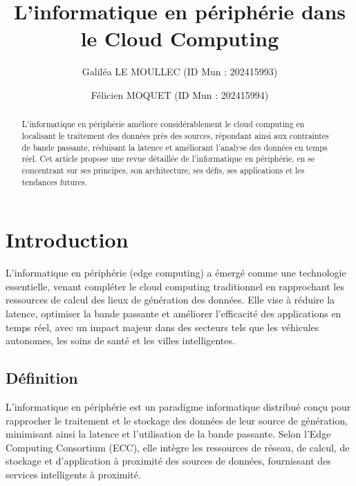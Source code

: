 \documentclass[runningheads]{llncs}
\begin{document}
\title{L'informatique en périphérie dans le Cloud Computing}

\author{Galiléa LE MOULLEC (ID Mun : 202415993) \and Félicien MOQUET (ID Mun : 202415994)}

\maketitle

\begin{abstract}
L'informatique en périphérie améliore considérablement le cloud computing en localisant le traitement des données près des sources, répondant ainsi aux contraintes de bande passante, réduisant la latence et améliorant l'analyse des données en temps réel. Cet article propose une revue détaillée de l'informatique en périphérie, en se concentrant sur ses principes, son architecture, ses défis, ses applications et les tendances futures.

\end{abstract}

\section{Introduction}
L’informatique en périphérie (edge computing) a émergé comme une technologie essentielle, venant compléter le cloud computing traditionnel en rapprochant les ressources de calcul des lieux de génération des données. Elle vise à réduire la latence, optimiser la bande passante et améliorer l’efficacité des applications en temps réel, avec un impact majeur dans des secteurs tels que les véhicules autonomes, les soins de santé et les villes intelligentes.

\subsection{Définition}
L’informatique en périphérie est un paradigme informatique distribué conçu pour rapprocher le traitement et le stockage des données de leur source de génération, minimisant ainsi la latence et l’utilisation de la bande passante. Selon l’Edge Computing Consortium (ECC), elle intègre les ressources de réseau, de calcul, de stockage et d’application à proximité des sources de données, fournissant des services intelligents à proximité.

\end{document}
